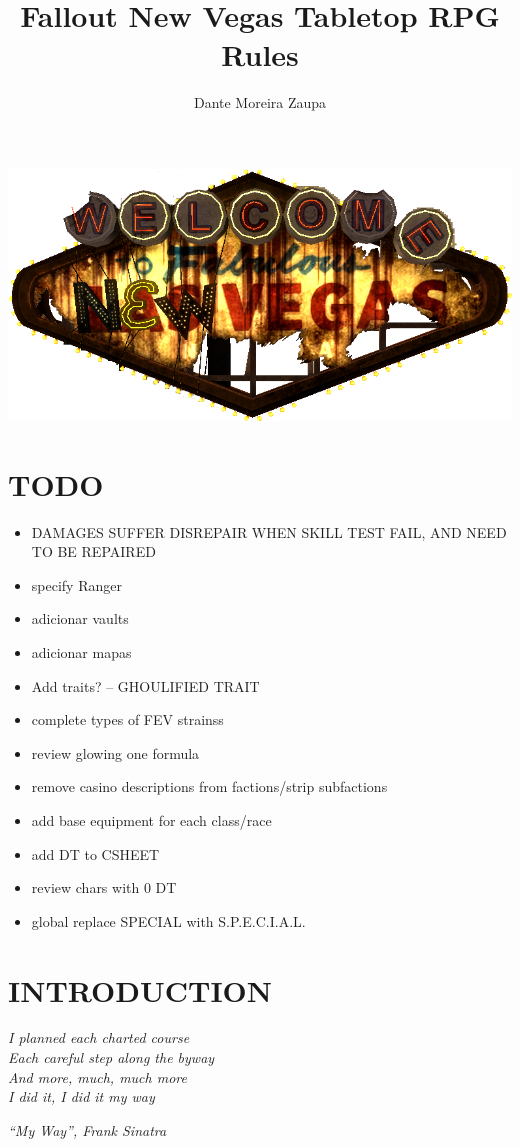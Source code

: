 \documentclass[11pt]{article} %
\title{Fallout New Vegas Tabletop RPG Rules}
\author{Dante Moreira Zaupa}
\begin{document}
\maketitle
\begin{center}
\includegraphics[scale=0.5]{logo_new_vegas.png}
\end{center}
\newpage
\tableofcontents
\newpage

\section{TODO}
\begin{itemize}
\item DAMAGES SUFFER DISREPAIR WHEN SKILL TEST FAIL, AND NEED TO BE REPAIRED
\item specify Ranger
\item adicionar vaults
\item adicionar mapas
\item Add traits? -- GHOULIFIED TRAIT
\item complete types of FEV strainss
\item review glowing one formula
\item remove casino descriptions from factions/strip subfactions
\item add base equipment for each class/race
\item add DT to CSHEET
\item review chars with 0 DT
\item global replace SPECIAL with S.P.E.C.I.A.L. 
\end{itemize}
\newpage

\section{INTRODUCTION}

\epigraph{\textit{I planned each charted course \\
Each careful step along the byway \\
And more, much, much more \\
I did it, I did it my way}}{\textit{``My Way'', Frank Sinatra}}
\end{document}
